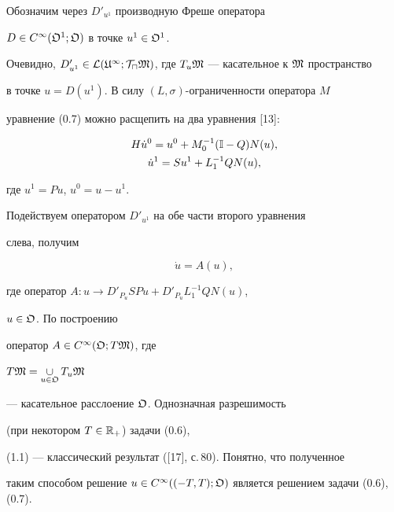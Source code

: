\begin{pf}


Обозначим через $D'_{u^1}$ производную Фреше оператора


$D \in C^{\infty}(\frak{O}^1;\frak{O})$ в точке $u^1 \in \frak{O}^1$.


Очевидно, $D'_{u^1} \in \cal{L}(\frak{U}^1;T_u


\frak{M})$, где $T_u \frak{M}$ --- касательное к $\frak{M}$ пространство 


в точке $u=D(u^1)$. В силу $(L,\sigma)$-ограниченности оператора $M$


уравнение (0.7) можно расщепить на два уравнения [13]:


\begin{gather*}


H\Dot u^0=u^0+M^{-1}_0(\Bbb I-Q)N(u),\\


\Dot u^1=S u^1+L^{-1}_1Q N(u),


\end{gather*}


где $u^1=Pu$, $u^0=u-u^1$.


Подействуем оператором $D'_{u^1}$ на обе части второго уравнения


слева, получим


\begin{equation}


\Dot{u}=A(u),


\end{equation}


где оператор $A:u \rightarrow D'_{P_u} S Pu+D'_{P_u} L^{-1}_1 Q N(u)$,


$u \in \frak{O}$. По построению


оператор $A \in C^{\infty}(\frak{O}; T\frak{M})$, где


$T\frak{M}=\mathop{\cup}\limits_{u \in \frak{O}} T_u \frak{M}$


--- касательное расслоение $\frak{O}$. Однозначная разрешимость


(при некотором $T\in\Bbb{R}_+$) задачи (0.6),


(1.1) --- классический результат ([17], с.\,80). Понятно, что полученное 


таким способом решение $u \in


C^{\infty}((-T,T); \frak{O})$ является решением задачи (0.6), (0.7).


\end{pf}








